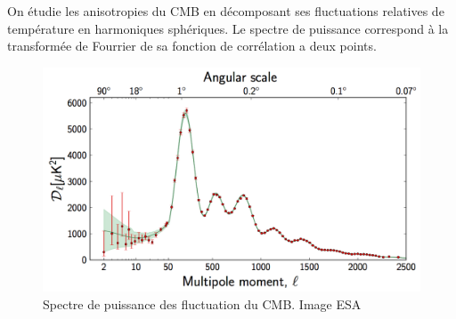 On étudie les anisotropies du \ac{CMB} en décomposant ses fluctuations relatives de température en harmoniques sphériques.
Le spectre de puissance correspond à la transformée de Fourrier de sa fonction de corrélation a deux points.

%
%
%
%
%
%


\begin{figure}[bth]
        \includegraphics[width=.95\linewidth]{img/01/CMB_power_spectrum.png} 
        \caption{Spectre de puissance des fluctuation du \ac{CMB}.
        Image ESA}
 		\label{fig:cmb_power_spectrum}
\end{figure}

